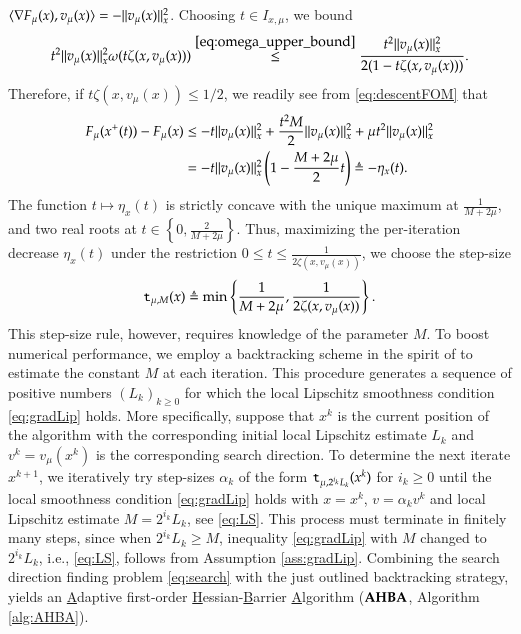 $\langle\nabla F_{\mu}(x),v_{\mu}(x)\rangle=-\lVert v_{\mu}(x)\rVert_{x}^{2}$. Choosing $t \in  I_{x,\mu}$, we bound
\[
t^{2}\lVert v_{\mu}(x)\rVert_{x}^{2}\omega(t\zeta(x,v_{\mu}(x))) \stackrel{\eqref{eq:omega_upper_bound}}{\leq}  \frac{t^{2}\lVert v_{\mu}(x)\rVert_{x}^{2}}{2(1-t\zeta(x,v_{\mu}(x)))}. 
\]
Therefore, if $t\zeta(x,v_{\mu}(x))\leq 1/2$, we readily see from \eqref{eq:descentFOM} that
\begin{align}
F_{\mu}(x^{+}(t))-F_{\mu}(x)&\leq -t\lVert v_{\mu}(x)\rVert_{x}^{2}+\frac{t^{2}M}{2}\lVert v_{\mu}(x)\rVert_{x}^{2}+\mu t^{2}\lVert v_{\mu}(x)\rVert_{x}^{2} \nonumber\\
&= -t \lVert v_{\mu}(x)\rVert_{x}^{2}\left(1-\frac{M+2\mu}{2}t\right) \triangleq -\eta_{x}(t).\label{eq:success}
\end{align}
The function $t \mapsto \eta_{x}(t)$ is strictly concave with the unique maximum at $ \frac{1}{M+2\mu}$, and two real roots at $t\in\left\{0,\frac{2}{M+2\mu}\right\}$. 
Thus, maximizing the per-iteration decrease $\eta_{x}(t)$  under the restriction $0\leq t\leq\frac{1}{2\zeta(x,v_{\mu}(x))}$, we choose the step-size
\begin{equation*}
\mathtt{t}_{\mu,M}(x)\triangleq \min \left\{\frac{1}{M+2\mu},\frac{1}{2\zeta(x,v_{\mu}(x))}\right\}.
\end{equation*}
This step-size rule, however, requires knowledge of the parameter $M$. To boost numerical performance, we employ a backtracking scheme in the spirit of \cite{NesPol06} to estimate the constant $M$ at each iteration. This procedure generates a sequence of positive numbers $(L_{k})_{k\geq 0}$ for which the local Lipschitz smoothness condition \eqref{eq:gradLip} holds. More specifically, suppose that $x^{k}$ is the current position of the algorithm with the corresponding initial local Lipschitz estimate $L_{k}$ and $v^{k}=v_{\mu}(x^{k})$ is the corresponding search direction. To determine the next iterate $x^{k+1}$, we iteratively try step-sizes $\alpha_k$ of the form $\mathtt{t}_{\mu,2^{i_k}L_k}(x^{k})$ for $i_k\geq 0$ until the local smoothness condition \eqref{eq:gradLip} holds with $x=x^{k}$, $v= \alpha_k v^{k}$ and local Lipschitz estimate $M=2^{i_k}L_k$, see \eqref{eq:LS}. This process must terminate in finitely many steps, since when $2^{i_k}L_k \geq M$, inequality \eqref{eq:gradLip} with $M$ changed to $2^{i_k}L_k$, i.e., \eqref{eq:LS}, follows from Assumption \ref{ass:gradLip}. Combining the search direction finding problem \eqref{eq:search} with the just outlined backtracking strategy, yields an \underline{A}daptive first-order \underline{H}essian-\underline{B}arrier \underline{A}lgorithm ($\operatorname{\mathbf{AHBA}}$, Algorithm \ref{alg:AHBA}).
